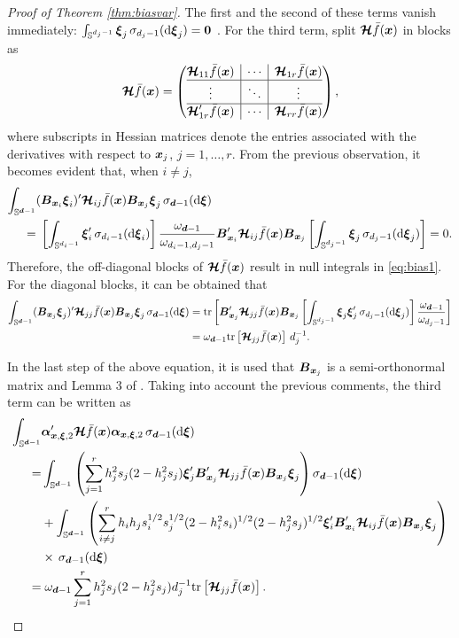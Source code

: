 \documentclass[oneside,11pt]{article}
\begin{document}
\begin{proof}[Proof of Theorem \ref{thm:biasvar}]
The first and the second of these terms vanish immediately: $\int_{\mathbb{S}^{d_j-1}}\boldsymbol\xi_j\,\sigma_{d_j-1}(\mathrm{d}\boldsymbol\xi_j)=\mathbf{0}$ \cite[see, e.g.,][Lemma 3]{Garcia-Portugues2013b}.
For the third term, split $\boldsymbol{\mathcal{H}}\bar{f}(\boldsymbol{x})$ in blocks as
\begin{align*}
    \bHcal\bar{f}(\bx)=\left(\begin{array}{@{}c|c|c@{}}
        \bHcal_{11}\bar{f}(\bx) & \cdots & \bHcal_{1r}\bar{f}(\bx) \\\hline
        \vdots & \ddots & \vdots \\\hline
        \bHcal'_{1r}\bar{f}(\bx) & \cdots & \bHcal_{rr}\bar{f}(\bx)
    \end{array}\right),
\end{align*}
where subscripts in Hessian matrices denote the entries associated with the derivatives with respect to $\boldsymbol{x}_j$, $j=1,\ldots,r$. From the previous observation, it becomes evident that, when $i\neq j$,
\begin{align*}
    \int_{\mathbb{S}^{\boldsymbol{d}-1}}&(\boldsymbol{B}_{\boldsymbol{x}_i}\boldsymbol\xi_i)'\boldsymbol{\mathcal{H}}_{ij} \bar{f}(\boldsymbol{x})\boldsymbol{B}_{\boldsymbol{x}_j}\boldsymbol\xi_j\,\sigma_{\boldsymbol{d}-1} (\mathrm{d}\boldsymbol\xi)\\
    =&\;\left[\int_{\mathbb{S}^{d_i-1}}\boldsymbol\xi_i'\,\sigma_{d_i-1}(\mathrm{d}\boldsymbol\xi_i)\right] \frac{\omega_{\boldsymbol{d}-1}}{\omega_{d_i-1,d_j-1}}\boldsymbol{B}_{\boldsymbol{x}_i}'\boldsymbol{\mathcal{H}}_{ij} \bar{f}(\boldsymbol{x})\boldsymbol{B}_{\boldsymbol{x}_j}\left[\int_{\mathbb{S}^{d_j-1}}\boldsymbol\xi_j\,\sigma_{d_j-1}(\mathrm{d}\boldsymbol\xi_j)\right]=0.
\end{align*}
Therefore, the off-diagonal blocks of $\boldsymbol{\mathcal{H}}\bar{f}(\boldsymbol{x})$ result in null integrals in \eqref{eq:bias1}. For the diagonal blocks, it can be obtained that
\begin{align*}
    \int_{\mathbb{S}^{\boldsymbol{d}-1}}(\boldsymbol{B}_{\boldsymbol{x}_j}\boldsymbol\xi_j)'\boldsymbol{\mathcal{H}}_{jj} \bar{f}(\boldsymbol{x})\boldsymbol{B}_{\boldsymbol{x}_j}\boldsymbol\xi_j\,\sigma_{\boldsymbol{d}-1} (\mathrm{d}\boldsymbol\xi)
    =&\;\mathrm{tr}\left[\boldsymbol{B}_{\boldsymbol{x}_j}'\boldsymbol{\mathcal{H}}_{jj}\bar{f}(\boldsymbol{x})\boldsymbol{B}_{\boldsymbol{x}_j}\left[\int_{\mathbb{S}^{d_j-1}}\boldsymbol\xi_j\boldsymbol\xi_j'\,\sigma_{d_j-1}(\mathrm{d}\boldsymbol\xi_j)\right] \frac{\omega_{\boldsymbol{d}-1}}{\omega_{d_j-1}}\right]\\
    =&\;\omega_{\boldsymbol{d}-1}\mathrm{tr}\left[\boldsymbol{\mathcal{H}}_{jj}\bar{f}(\boldsymbol{x})\right] \, d_j^{-1}.
\end{align*}

In the last step of the above equation, it is used that $\boldsymbol{B}_{\boldsymbol{x}_j}$ is a semi-orthonormal matrix and Lemma 3 of \cite{Garcia-Portugues2013b}.
Taking into account the previous comments, the third term can be written as
\begin{align}\label{eq:bias_int22}
	\int_{\mathbb{S}^{\bd-1}}&\ba'_{\bx,\bxi,2}\bHcal \bar{f}(\bx)\ba_{\bx,\bxi,2}\,\sigmarm (\rd\bxi)\nonumber\\
%
    =&\int_{\mathbb{S}^{\bd-1}}\left(\sum_{j=1}^rh_j^2s_j(2-h_j^2s_j)\bxi'_{j}\bB_{\bx_j}'\bHcal_{jj}\bar{f}(\bx)\bB_{\bx_j}\bxi_j\right)\sigmarm (\rd\bxi)\nonumber\\
    &+\int_{\mathbb{S}^{\bd-1}}\left(\sum_{i\neq j}^rh_ih_js_i^{1/2}s_j^{1/2}(2-h_i^2s_i)^{1/2}(2-h_j^2s_j)^    {1/2}\bxi'_{i}\bB_{\bx_i}'\bHcal_{ij}\bar{f}(\bx)\bB_{\bx_j}\bxi_j\right)\nonumber\\
    &\times\,\sigmarm (\rd\bxi)\nonumber\\
	=&\;\omega_{\bd-1}\sum_{j=1}^rh_j^2s_j(2-h_j^2s_j)d_j^{-1}\tr{\bHcal_{jj}\bar{f}(\bx)}.
\end{align}


\end{proof}
\end{document}
